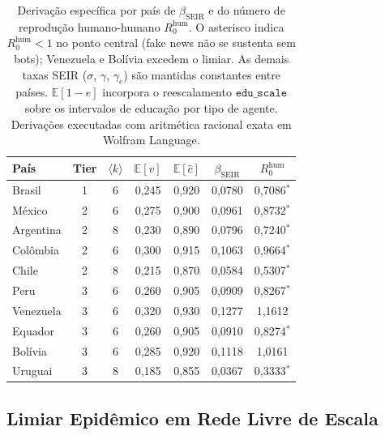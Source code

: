 \documentclass[12pt,a4paper]{article}
\theoremstyle{definition}
\theoremstyle{plain}
\begin{document}
\begin{table}[H]
\centering
\small
\setlength{\tabcolsep}{10pt}
\renewcommand{\arraystretch}{1.20}
\begin{tabular}{lcccccc}
\toprule
\textbf{País} & \textbf{Tier} & $\langle k \rangle$ & $\mathbb{E}[v]$ & $\mathbb{E}[\hat{c}]$ & $\beta_{\text{SEIR}}$ & $R_0^{\text{hum}}$ \\
\midrule
Brasil    & 1 & 6 & 0,245 & 0,920 & 0,0780 & 0,7086$^{\ast}$ \\
México    & 2 & 6 & 0,275 & 0,900 & 0,0961 & 0,8732$^{\ast}$ \\
Argentina & 2 & 8 & 0,230 & 0,890 & 0,0796 & 0,7240$^{\ast}$ \\
Colômbia  & 2 & 6 & 0,300 & 0,915 & 0,1063 & 0,9664$^{\ast}$ \\
Chile     & 2 & 8 & 0,215 & 0,870 & 0,0584 & 0,5307$^{\ast}$ \\
Peru      & 3 & 6 & 0,260 & 0,905 & 0,0909 & 0,8267$^{\ast}$ \\
Venezuela & 3 & 6 & 0,320 & 0,930 & 0,1277 & 1,1612 \\
Equador   & 3 & 6 & 0,260 & 0,905 & 0,0910 & 0,8274$^{\ast}$ \\
Bolívia   & 3 & 6 & 0,285 & 0,920 & 0,1118 & 1,0161 \\
Uruguai   & 3 & 8 & 0,185 & 0,855 & 0,0367 & 0,3333$^{\ast}$ \\
\bottomrule
\end{tabular}
\caption{Derivação específica por país de $\beta_{\text{SEIR}}$ e do número de reprodução humano-humano $R_0^{\text{hum}}$. O asterisco indica $R_0^{\text{hum}} < 1$ no ponto central (fake news não se sustenta sem bots); Venezuela e Bolívia excedem o limiar. As demais taxas SEIR ($\sigma$, $\gamma$, $\gamma_e$) são mantidas constantes entre países. $\mathbb{E}[1-e]$ incorpora o reescalamento $\texttt{edu\_scale}$ sobre os intervalos de educação por tipo de agente. Derivações executadas com aritmética racional exata em Wolfram Language.}
\label{tab:country_R0}
\end{table}

\subsection{Limiar Epidêmico em Rede Livre de Escala}
\label{subsec:scalefree}
\end{document}
